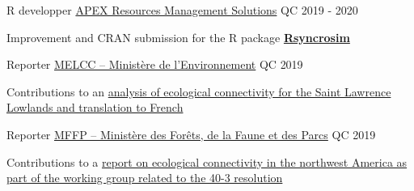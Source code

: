 \vspace{-6pt}

\begin{cventries}

    \cventry
    {R developper} %
    {\href{https://apexrms.com/}{APEX Resources Management Solutions}} %
    {QC} %
    {2019 - 2020} %
    {
      \begin{cvitems} %
        \item {Improvement and CRAN submission for the R package \href{https://github.com/syncrosim/rsyncrosim}{\textbf{Rsyncrosim}}}
      \end{cvitems}
    }

    \cventry
    {Reporter} %
    {\href{https://www.environnement.gouv.qc.ca/}{MELCC – Ministère de l'Environnement}} %
    {QC} %
    {2019} %
    {
      \begin{cvitems} %
        \item {Contributions to an \href{https://quebio.ca/fr/rapport_connectivite}{analysis of ecological connectivity for the Saint Lawrence Lowlands and translation to French}}
      \end{cvitems}
    }

    \cventry
    {Reporter} %
    {\href{https://mffp.gouv.qc.ca/}{MFFP – Ministère des Forêts, de la Faune et des Parcs}} %
    {QC} %
    {2019} %
    {
      \begin{cvitems} %
        \item {Contributions to a \href{https://ecologicalconnectivity.com/sites/default/files/2021-07/Connectivity-Analysis-40-3_Report.pdf}{report on ecological connectivity in the northwest America as part of the working group related to the 40-3 resolution}}
      \end{cvitems}
    }
  
\end{cventries}